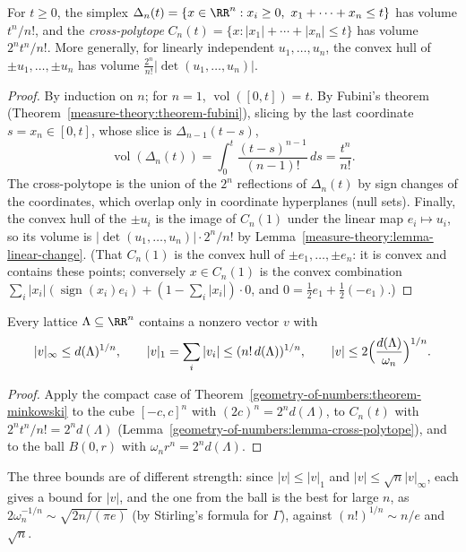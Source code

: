 \begin{lemma}\label{geometry-of-numbers:lemma-cross-polytope}
For $t \geq 0$, the simplex $\Delta_n(t) = \{x \in \RR^n : x_i \geq 0, \ x_1 + \cdots + x_n \leq t\}$ has volume $t^n/n!$, and the \emph{cross-polytope} $C_n(t) = \{x : |x_1| + \cdots + |x_n| \leq t\}$
has volume $2^nt^n/n!$. More generally, for linearly independent $u_1, \ldots, u_n$, the convex hull of $\pm u_1, \ldots, \pm u_n$ has volume $\frac{2^n}{n!}|\det(u_1, \ldots, u_n)|$.
\end{lemma}

\begin{proof}
By induction on $n$; for $n = 1$, $\operatorname{vol}([0, t]) = t$. By Fubini's theorem (Theorem~\ref{measure-theory:theorem-fubini}), slicing by the last coordinate $s = x_n \in [0, t]$, whose slice is
$\Delta_{n-1}(t - s)$,
\[
\operatorname{vol}(\Delta_n(t)) = \int_0^t\frac{(t - s)^{n-1}}{(n - 1)!}\,ds = \frac{t^n}{n!}.
\]
The cross-polytope is the union of the $2^n$ reflections of $\Delta_n(t)$ by sign changes of the coordinates, which overlap only in coordinate hyperplanes (null sets). Finally, the convex hull of the
$\pm u_i$ is the image of $C_n(1)$ under the linear map $e_i \mapsto u_i$, so its volume is $|\det(u_1, \ldots, u_n)|\cdot 2^n/n!$ by Lemma~\ref{measure-theory:lemma-linear-change}. (That $C_n(1)$ is the
convex hull of $\pm e_1, \ldots, \pm e_n$: it is convex and contains these points; conversely $x \in C_n(1)$ is the convex combination $\sum_i|x_i|(\operatorname{sign}(x_i)e_i) + (1 - \sum_i|x_i|)\cdot 0$,
and $0 = \frac12e_1 + \frac12(-e_1)$.)
\end{proof}

\begin{corollary}\label{geometry-of-numbers:corollary-short-vector}
Every lattice $\Lambda \subseteq \RR^n$ contains a nonzero vector $v$ with
\[
|v|_\infty \leq d(\Lambda)^{1/n}, \qquad |v|_1 = \sum_i|v_i| \leq (n!\,d(\Lambda))^{1/n}, \qquad |v| \leq 2\Bigl(\frac{d(\Lambda)}{\omega_n}\Bigr)^{1/n}.
\]
\end{corollary}

\begin{proof}
Apply the compact case of Theorem~\ref{geometry-of-numbers:theorem-minkowski} to the cube $[-c, c]^n$ with $(2c)^n = 2^nd(\Lambda)$, to $C_n(t)$ with $2^nt^n/n! = 2^nd(\Lambda)$
(Lemma~\ref{geometry-of-numbers:lemma-cross-polytope}), and to the ball $B(0, r)$ with $\omega_nr^n = 2^nd(\Lambda)$.
\end{proof}

The three bounds are of different strength: since $|v| \leq |v|_1$ and $|v| \leq \sqrt n|v|_\infty$, each gives a bound for $|v|$, and the one from the ball is the best for large $n$, as
$2\omega_n^{-1/n} \sim \sqrt{2n/(\pi e)}$ (by Stirling's formula for $\Gamma$), against $(n!)^{1/n} \sim n/e$ and $\sqrt n$.

